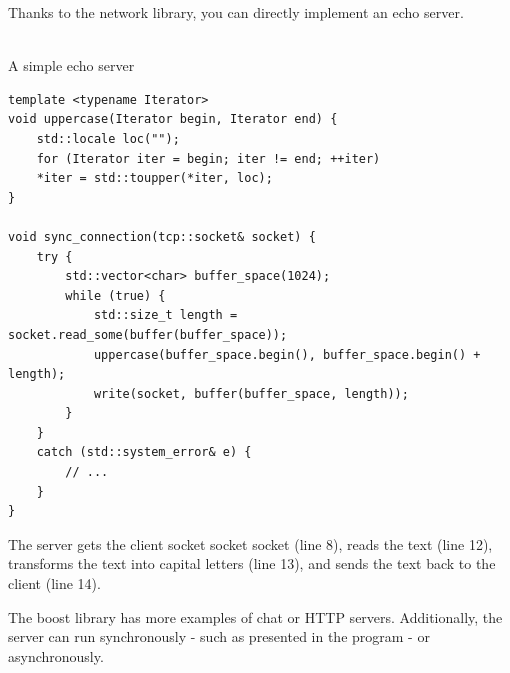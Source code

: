 Thanks to the network library, you can directly implement an echo server.

\hspace*{\fill} \\ %
\noindent
A simple echo server
\begin{lstlisting}[style=styleCXX]
template <typename Iterator>
void uppercase(Iterator begin, Iterator end) {
	std::locale loc("");
	for (Iterator iter = begin; iter != end; ++iter)
	*iter = std::toupper(*iter, loc);
}

void sync_connection(tcp::socket& socket) {
	try {
		std::vector<char> buffer_space(1024);
		while (true) {
			std::size_t length = socket.read_some(buffer(buffer_space));
			uppercase(buffer_space.begin(), buffer_space.begin() + length);
			write(socket, buffer(buffer_space, length));
		}
	}
	catch (std::system_error& e) {
		// ...
	}
}
\end{lstlisting}

The server gets the client socket socket socket (line 8), reads the text (line 12), transforms the text into capital letters (line 13), and sends the text back to the client (line 14).

The boost library has more examples of chat or HTTP servers. Additionally, the server can run synchronously - such as presented in the program - or asynchronously.






















